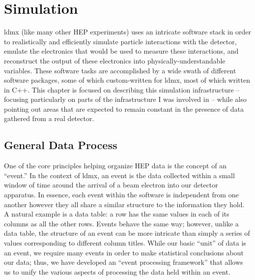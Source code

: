 \chapter{Simulation}
\label{chapter:ldmx:simulation}

\ac{ldmx} (like many other HEP experiments) uses an intricate software stack in order to realistically and efficiently simulate particle interactions with the detector, emulate the electronics that would be used to measure these interactions, and reconstruct the output of these electronics into physically-understandable variables.
These software tasks are accomplished by a wide swath of different software packages, some of which custom-written for \ac{ldmx}, most of which written in C++.
This chapter is focused on describing this simulation infrastructure -- focusing particularly on parts of the infrastructure I was involved in -- while also pointing out areas that are expected to remain constant in the presence of data gathered from a real detector.

\section{General Data Process}
One of the core principles helping organize HEP data is the concept of an ``event.'' In the context
of \ac{ldmx}, an event is the data collected within a small window of time around the arrival of a
beam electron into our detector apparatus. In essence, each event within the software is
independent from one another however they all share a similar structure to the information they
hold. A natural example is a data table: a row has the same values in each of its columns as all
the other rows. Events behave the same way; however, unlike a data table, the structure of an event
can be more intricate than simply a series of values corresponding to different column titles.
While our basic ``unit'' of data is an event, we require many events in order to make statistical
conclusions about our data; thus, we have developed an ``event processing framework'' that allows
us to unify the various aspects of processing the data held within an event.

